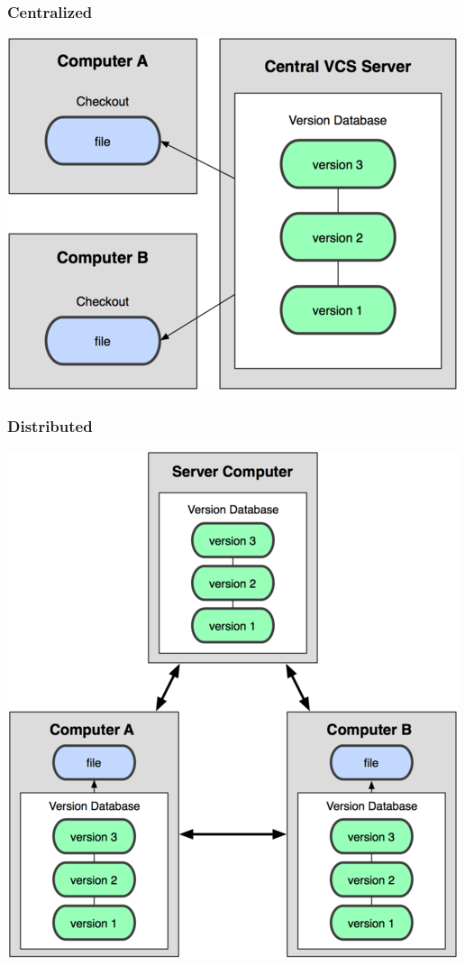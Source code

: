 \documentclass{beamer}
\begin{document}
\begin{frame}
\frametitle{Centralized}
\begin{center}
  \includegraphics[width=\textwidth,height=0.6\textheight,keepaspectratio]{imgs/centralized.png}
\end{center}
\end{frame}

\begin{frame}
\frametitle{Distributed}
\begin{center}
  \includegraphics[width=\textwidth,height=0.8\textheight,keepaspectratio]{imgs/distributed.png}
\end{center}
\end{frame}
\end{document}
